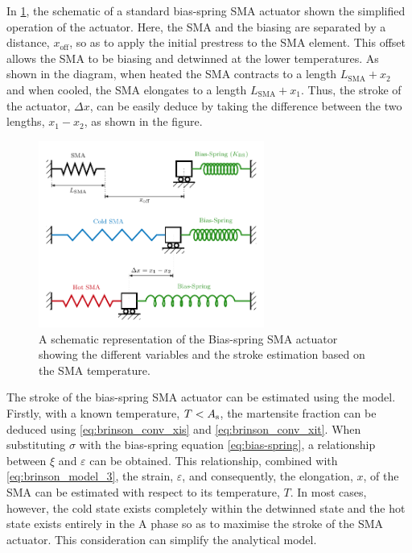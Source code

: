 In \cref{fig:bias-spring-diagram}, the schematic of a standard bias-spring SMA actuator shown the simplified operation of the actuator. Here, the SMA and the biasing are separated by a distance, $x_\mathrm{off}$, so as to apply the initial prestress to the SMA element. This offset allows the SMA to be biasing and detwinned at the lower temperatures. As shown in the diagram, when heated the SMA contracts to a length $L_\mathrm{SMA}+x_2$ and when cooled, the SMA elongates to a length $L_\mathrm{SMA}+x_1$. Thus, the stroke of the actuator, $\Delta x$, can be easily deduce by taking the difference between the two lengths, $x_1-x_2$, as shown in the figure.
\begin{figure}[hbt]
    \centering
    \includegraphics[width=0.66\textwidth]{images/chap2/bias-spring-diagram.pdf}
    \caption{A schematic representation of the Bias-spring SMA actuator showing the different variables and the stroke estimation based on the SMA temperature.}
    \label{fig:bias-spring-diagram}
\end{figure}

The stroke of the bias-spring SMA actuator can be estimated using the \cite{brinsonOneDimensionalConstitutiveBehavior1993} model. Firstly, with a known temperature, $T < A_\mathrm{s}$, the martensite fraction can be deduced using \cref{eq:brinson_conv_xis} and \cref{eq:brinson_conv_xit}. When substituting $\sigma$ with the bias-spring equation \ref{eq:bias-spring}, a relationship between $\xi$ and $\varepsilon$ can be obtained. This relationship, combined with \cref{eq:brinson_model_3}, the strain, $\varepsilon$, and consequently, the elongation, $x$, of the SMA can be estimated with respect to its temperature, $T$. In most cases, however, the cold state exists completely within the detwinned state and the hot state exists entirely in the A phase so as to maximise the stroke of the SMA actuator. This consideration can simplify the analytical model.

